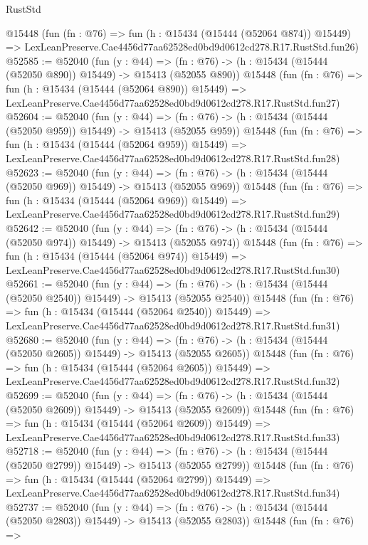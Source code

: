 \begin{lexlean}{RustStd}
\begin{coremodule}
    @15448
    (fun (fn : @76) =>
    fun (h : @15434 (@15444 (@52064 @874)) @15449) =>
    LexLeanPreserve.Cae4456d77aa62528ed0bd9d0612cd278.R17.RustStd.fun26)
@52585 := @52040
    (fun (y : @44) =>
    (fn : @76) -> (h : @15434 (@15444 (@52050 @890)) @15449) -> @15413 (@52055 @890))
    @15448
    (fun (fn : @76) =>
    fun (h : @15434 (@15444 (@52064 @890)) @15449) =>
    LexLeanPreserve.Cae4456d77aa62528ed0bd9d0612cd278.R17.RustStd.fun27)
@52604 := @52040
    (fun (y : @44) =>
    (fn : @76) -> (h : @15434 (@15444 (@52050 @959)) @15449) -> @15413 (@52055 @959))
    @15448
    (fun (fn : @76) =>
    fun (h : @15434 (@15444 (@52064 @959)) @15449) =>
    LexLeanPreserve.Cae4456d77aa62528ed0bd9d0612cd278.R17.RustStd.fun28)
@52623 := @52040
    (fun (y : @44) =>
    (fn : @76) -> (h : @15434 (@15444 (@52050 @969)) @15449) -> @15413 (@52055 @969))
    @15448
    (fun (fn : @76) =>
    fun (h : @15434 (@15444 (@52064 @969)) @15449) =>
    LexLeanPreserve.Cae4456d77aa62528ed0bd9d0612cd278.R17.RustStd.fun29)
@52642 := @52040
    (fun (y : @44) =>
    (fn : @76) -> (h : @15434 (@15444 (@52050 @974)) @15449) -> @15413 (@52055 @974))
    @15448
    (fun (fn : @76) =>
    fun (h : @15434 (@15444 (@52064 @974)) @15449) =>
    LexLeanPreserve.Cae4456d77aa62528ed0bd9d0612cd278.R17.RustStd.fun30)
@52661 := @52040
    (fun (y : @44) =>
    (fn : @76) -> (h : @15434 (@15444 (@52050 @2540)) @15449) -> @15413 (@52055 @2540))
    @15448
    (fun (fn : @76) =>
    fun (h : @15434 (@15444 (@52064 @2540)) @15449) =>
    LexLeanPreserve.Cae4456d77aa62528ed0bd9d0612cd278.R17.RustStd.fun31)
@52680 := @52040
    (fun (y : @44) =>
    (fn : @76) -> (h : @15434 (@15444 (@52050 @2605)) @15449) -> @15413 (@52055 @2605))
    @15448
    (fun (fn : @76) =>
    fun (h : @15434 (@15444 (@52064 @2605)) @15449) =>
    LexLeanPreserve.Cae4456d77aa62528ed0bd9d0612cd278.R17.RustStd.fun32)
@52699 := @52040
    (fun (y : @44) =>
    (fn : @76) -> (h : @15434 (@15444 (@52050 @2609)) @15449) -> @15413 (@52055 @2609))
    @15448
    (fun (fn : @76) =>
    fun (h : @15434 (@15444 (@52064 @2609)) @15449) =>
    LexLeanPreserve.Cae4456d77aa62528ed0bd9d0612cd278.R17.RustStd.fun33)
@52718 := @52040
    (fun (y : @44) =>
    (fn : @76) -> (h : @15434 (@15444 (@52050 @2799)) @15449) -> @15413 (@52055 @2799))
    @15448
    (fun (fn : @76) =>
    fun (h : @15434 (@15444 (@52064 @2799)) @15449) =>
    LexLeanPreserve.Cae4456d77aa62528ed0bd9d0612cd278.R17.RustStd.fun34)
@52737 := @52040
    (fun (y : @44) =>
    (fn : @76) -> (h : @15434 (@15444 (@52050 @2803)) @15449) -> @15413 (@52055 @2803))
    @15448
    (fun (fn : @76) =>

\end{coremodule}
\end{lexlean}
